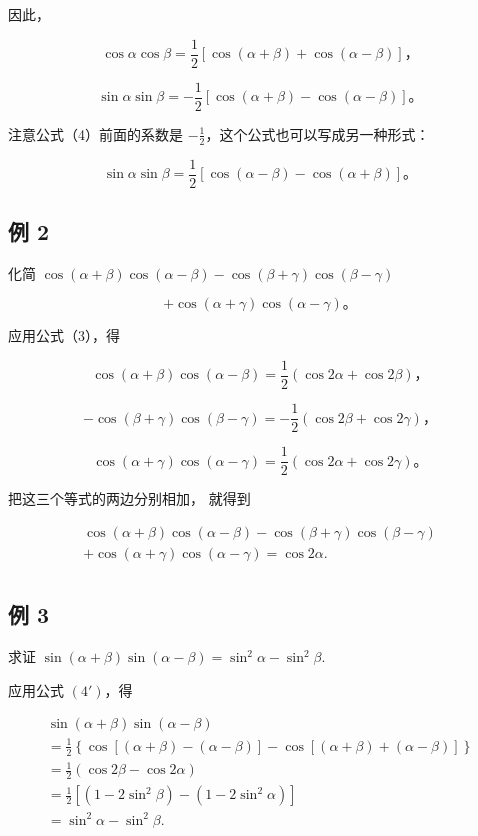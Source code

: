 因此，

\[
\cos \alpha \cos \beta = \frac {1}{2} [ \cos (\alpha + \beta) + \cos (\alpha - \beta) ]\text{，} \tag {3}
\]

\[
\sin \alpha \sin \beta = - \frac {1}{2} [ \cos (\alpha + \beta) - \cos (\alpha - \beta) ]\text{。} \tag {4}
\]

注意公式（4）前面的系数是
\(-\frac{1}{2}\)，这个公式也可以写成另一种形式：

\[
\sin \alpha \sin \beta = \frac {1}{2} [ \cos (\alpha - \beta) - \cos (\alpha + \beta) ]\text{。} \tag{4′}
\]

\subsection{例 2}

化简
\(\cos (\alpha +\beta)\cos (\alpha -\beta) - \cos (\beta +\gamma)\cos (\beta -\gamma)\)

\[
+ \cos (\alpha + \gamma) \cos (\alpha - \gamma)\text{。}
\]

 应用公式（3），得

\[
\cos (\alpha + \beta) \cos (\alpha - \beta) = \frac {1}{2} (\cos 2 \alpha + \cos 2 \beta)\text{，}
\]

\[
- \cos (\beta + \gamma) \cos (\beta - \gamma) = - \frac {1}{2} (\cos 2 \beta + \cos 2 \gamma)\text{，}
\]

\[
\cos (\alpha + \gamma) \cos (\alpha - \gamma) = \frac {1}{2} (\cos 2 \alpha + \cos 2 \gamma)\text{。}
\]

把这三个等式的两边分别相加， 就得到

\[
\begin{array}{l} \cos (\alpha + \beta) \cos (\alpha - \beta) - \cos (\beta + \gamma) \cos (\beta - \gamma) \\ + \cos (\alpha + \gamma) \cos (\alpha - \gamma) = \cos 2 \alpha . \\ \end{array}
\]

\subsection{例 3}

求证
\(\sin (\alpha +\beta)\sin (\alpha -\beta) = \sin^2\alpha -\sin^2\beta .\)

 应用公式 \((4')\)，得

\[
\begin{array}{l} \sin (\alpha + \beta) \sin (\alpha - \beta) \\ = \frac {1}{2} \left\{\cos [ (\alpha + \beta) - (\alpha - \beta) ] - \cos [ (\alpha + \beta) + (\alpha - \beta) ] \right\} \\ = \frac {1}{2} (\cos 2 \beta - \cos 2 \alpha) \\ = \frac {1}{2} \left[ (1 - 2 \sin^ {2} \beta) - (1 - 2 \sin^ {2} \alpha) \right] \\ = \sin^ {2} \alpha - \sin^ {2} \beta . \\ \end{array}
\]

